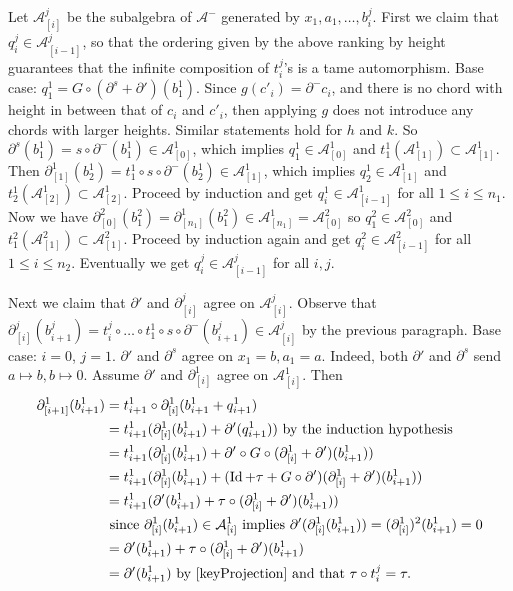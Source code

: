 \documentclass[11pt]{amsart}
\makeatletter
\renewenvironment{proof}[1][\proofname] {\par\pushQED{\qed}{\normalfont\bfseries\topsep6\p@\@plus6\p@\relax #1\@addpunct{.} }}{\popQED\endtrivlist\@endpefalse}
\theoremstyle{mystyle}
\newcommand{\<}{\langle}
\renewcommand{\>}{\rangle}
\DeclareMathOperator{\Id}{Id}
\makeatother
\begin{document}
\begin{proof}
    Let $\mathcal{A}_{[i]}^j$ be the subalgebra of $\mathcal{A}^-$ generated by $x_1, a_1, \ldots, b_i^j$. First we claim that $q_i^j \in \mathcal{A}_{[i-1]}^j$, so that the ordering given by the above ranking by height guarantees that the infinite composition of $t^j_i$'s is a tame automorphism. Base case: $q_1^1 = G \circ (\partial^s + \partial')(b_1^1)$. Since $g(c'_i) = \partial^- c_i$, and there is no chord with height in between that of $c_i$ and $c'_i$, then applying $g$ does not introduce any chords with larger heights. Similar statements hold for $h$ and $k$. So $\partial^s(b_1^1) = s \circ \partial^- (b_1^1) \in \mathcal{A}_{[0]}^1$, which implies $q_1^1 \in \mathcal{A}_{[0]}^1$ and $t_1^1(\mathcal{A}_{[1]}^1) \subset \mathcal{A}_{[1]}^1$. Then $\partial_{[1]}^1(b_2^1) = t_1^1 \circ s \circ \partial^- (b_2^1) \in \mathcal{A}_{[1]}^1$, which implies $q_2^1 \in \mathcal{A}_{[1]}^1$ and $t_2^1(\mathcal{A}_{[2]}^1) \subset \mathcal{A}_{[2]}^1$. Proceed by induction and get $q_{i}^1 \in \mathcal{A}_{[i-1]}^1$ for all $1 \leq i \leq n_1$. Now we have $\partial_{[0]}^2(b_1^2) = \partial_{[n_1]}^1(b_1^2) \in \mathcal{A}_{[n_1]}^1 = \mathcal{A}_{[0]}^2$ so $q_1^2 \in \mathcal{A}_{[0]}^2$ and $t_1^2(\mathcal{A}_{[1]}^2) \subset \mathcal{A}_{[1]}^2$. Proceed by induction again and get $q_{i}^2 \in \mathcal{A}_{[i-1]}^2$ for all $1 \leq i \leq n_2$. Eventually we get $q_i^j \in \mathcal{A}_{[i-1]}^j$ for all $i, j$.
	
	Next we claim that $\partial'$ and $\partial_{[i]}^j$ agree on $\mathcal{A}_{[i]}^j$. Observe that $\partial_{[i]}^j(b_{i+1}^j) = t_i^j \circ \dots  \circ t_1^1 \circ s \circ \partial^-(b_{i+1}^j) \in \mathcal{A}_{[i]}^j$ by the previous paragraph. Base case: $i = 0$, $j = 1$. $\partial'$ and $\partial^s$ agree on $x_1 = b, a_1 = a$. Indeed, both $\partial'$ and $\partial^s$ send $a \mapsto b, b \mapsto 0$. Assume $\partial'$ and $\partial_{[i]}^1$ agree on $\mathcal{A}_{[i]}^1$. Then \begin{align*}
		\partial^1_{[i+1]}(b_{i+1}^1) &= t_{i+1}^1 \circ \partial^1_{[i]} (b_{i+1}^1 + q_{i+1}^1) \\
		&= t_{i+1}^1 (\partial^1_{[i]}(b_{i+1}^1) + \partial'(q_{i+1}^1)) \text{ by the induction hypothesis}\\
		&= t_{i+1}^1 (\partial^1_{[i]}(b_{i+1}^1) + \partial' \circ G \circ (\partial^1_{[i]} + \partial')(b_{i+1}^1)) \\
		&= t_{i+1}^1 (\partial^1_{[i]}(b_{i+1}^1) + (\Id + \tau + G \circ \partial') (\partial^1_{[i]} + \partial')(b_{i+1}^1)) \\
		&= t_{i+1}^1(\partial'(b^1_{i+1}) + \tau \circ (\partial^1_{[i]} + \partial')(b_{i+1}^1)) \\
		&\text{ since $\partial^1_{[i]}(b_{i+1}^1) \in \mathcal{A}_{[i]}^1$ implies $\partial'(\partial^1_{[i]}(b_{i+1}^1)) = (\partial^1_{[i]})^2(b_{i+1}^1) = 0$} \\
		&= \partial'(b^1_{i+1}) + \tau \circ (\partial^1_{[i]} + \partial')(b_{i+1}^1) \\
		&= \partial'(b^1_{i+1}) \text{ by \Cref{keyProjection} and that } \tau \circ t_i^j = \tau.
	\end{align*}
    

\end{proof}
\end{document}
